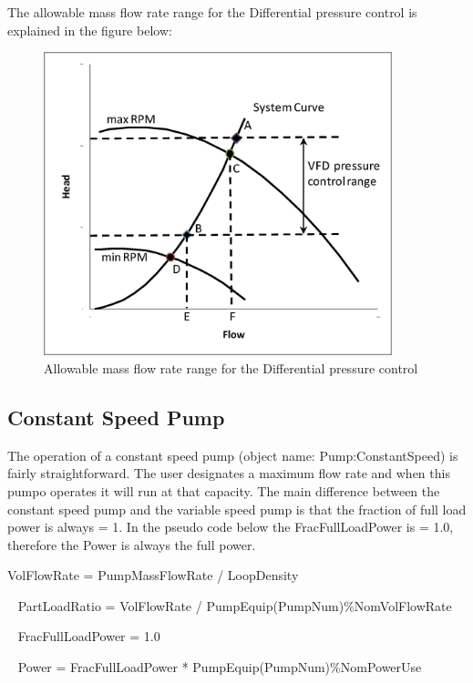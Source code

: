 The allowable mass flow rate range for the Differential pressure control is explained in the figure below:

\begin{figure}[hbtp] %
\centering
\includegraphics[width=0.9\textwidth, height=0.9\textheight, keepaspectratio=true]{media/image5856.png}
\caption{Allowable mass flow rate range for the Differential pressure control \protect \label{fig:allowable-mass-flow-rate-range-for}}
\end{figure}

\subsection{Constant Speed Pump}\label{constant-speed-pump}

The operation of a constant speed pump (object name: Pump:ConstantSpeed) is fairly straightforward. The user designates a maximum flow rate and when this pumpo operates it will run at that capacity. The main difference between the constant speed pump and the variable speed pump is that the fraction of full load power is always = 1. In the pseudo code below the FracFullLoadPower is = 1.0, therefore the Power is always the full power.

VolFlowRate = PumpMassFlowRate / LoopDensity

~ PartLoadRatio = VolFlowRate / PumpEquip(PumpNum)\%NomVolFlowRate

~ FracFullLoadPower = 1.0

~ Power = FracFullLoadPower * PumpEquip(PumpNum)\%NomPowerUse

